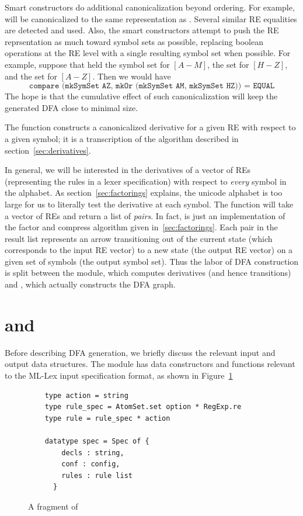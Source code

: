 Smart constructors do additional canonicalization beyond ordering.  For
example,  will be canonicalized
to the same representation as .  Several similar RE equalities
are detected and used.  Also, the smart constructors attempt to push the RE
reprsentation as much toward symbol sets as possible, replacing boolean
operations at the RE level with a single resulting symbol set when possible.
For example, suppose that  held the symbol set for $[A-M]$,  the
set for $[H-Z]$, and  the set for $[A-Z]$. Then we would have
\[
\texttt{compare (mkSymSet AZ, mkOr (mkSymSet AM, mkSymSet HZ)) = EQUAL}
\]
The hope is that the cumulative effect of such canonicalization will keep the
generated DFA close to minimal size.

The  function constructs a canonicalized derivative for a given
RE with respect to a given symbol; it is a transcription of the algorithm
described in section~\ref{sec:derivatives}.

In general, we will be interested in the derivatives of a vector of REs
(representing the rules in a lexer specification) with respect to \emph{every}
symbol in the alphabet.  As section~\ref{sec:factorings} explains, the unicode
alphabet is too large for us to literally test the derivative at each symbol. 
The  function will take a vector of REs and return a list of
 \emph{pairs}.  In fact, 
is just an implementation of the factor and compress algorithm given
in~\ref{sec:factorings}.  Each pair in the result list represents an arrow
transitioning out of the current state (which corresponds to the input RE
vector) to a new state (the output RE vector) on a given set of symbols (the
output symbol set).  Thus the labor of DFA construction is split between the
 module, which computes derivatives (and hence transitions) and
, which actually constructs the DFA graph.

\section{ and }

Before describing DFA generation, we briefly discuss the relevant input and
output data structures.  The  module has data constructors and
functions relevant to \eg the ML-Lex input specification format, as shown in
Figure~\ref{fig:lex-spec}

\begin{figure}
\begin{verbatim}
    type action = string
    type rule_spec = AtomSet.set option * RegExp.re
    type rule = rule_spec * action

    datatype spec = Spec of {
        decls : string,
        conf : config,
        rules : rule list
      }
\end{verbatim}
\caption{A fragment of }\label{fig:lex-spec}
\end{figure}


